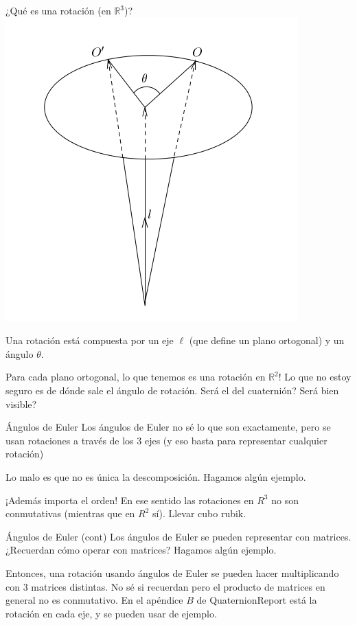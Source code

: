 \documentclass[10pt]{beamer}
\def\R{\mathbb{R}}
\begin{document}
\begin{frame}{¿Qué es una rotación (en $\R^3$)?}
	\includegraphics[scale=0.6]{rotation.png}
	
	Una rotación está compuesta por un eje $\ell$ (que define un plano ortogonal) y un ángulo $\theta$.
	
	Para cada plano ortogonal, lo que tenemos es una rotación en $\R^2$! Lo que no estoy seguro es de dónde sale el ángulo de rotación. Será el del cuaternión? Será bien visible?
\end{frame}

\begin{frame}{Ángulos de Euler}
	Los ángulos de Euler no sé lo que son exactamente, pero se usan rotaciones a través de los 3 ejes (y eso basta para representar cualquier rotación)	
	
	Lo malo es que no es única la descomposición. Hagamos algún ejemplo.
	
	¡Además importa el orden! En ese sentido las rotaciones en $R^3$ no son conmutativas (mientras que en $R^2$ sí). Llevar cubo rubik.
\end{frame}

\begin{frame}{Ángulos de Euler (cont)}
	Los ángulos de Euler se pueden representar con matrices. ¿Recuerdan cómo operar con matrices? Hagamos algún ejemplo.
	
	Entonces, una rotación usando ángulos de Euler se pueden hacer multiplicando con 3 matrices distintas. No sé si recuerdan pero el producto de matrices en general no es conmutativo. En el apéndice $B$ de QuaternionReport está la rotación en cada eje, y se pueden usar de ejemplo.
\end{frame}
\end{document}
